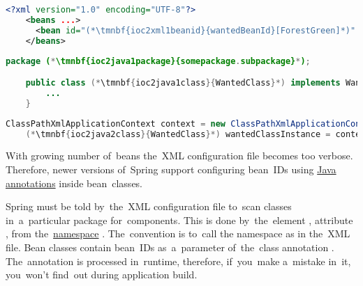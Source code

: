 \begin{lstlisting}[language=XML, title={Configuration XML}]
    <?xml version="1.0" encoding="UTF-8"?>
    <beans ...>
      <bean id="(*\tmnbf{ioc2xml1beanid}{wantedBeanId}[ForestGreen]*)" class="(*\tmnbf{ioc2xml1package}{somepackage.subpackage}[ForestGreen]*).(*\tmnbf{ioc2xml1class}{WantedClass}[ForestGreen]*)"/>
    </beans>
\end{lstlisting}
\begin{lstlisting}[language=Java, title={Wanted class}]
    package (*\tmnbf{ioc2java1package}{somepackage.subpackage}*);

    public class (*\tmnbf{ioc2java1class}{WantedClass}*) implements WantedClassInterface {
        ...
    }
\end{lstlisting}
\begin{lstlisting}[language=Java, title={Usage}]
    ClassPathXmlApplicationContext context = new ClassPathXmlApplicationContext("configurationFile.xml");
    (*\tmnbf{ioc2java2class}{WantedClass}*) wantedClassInstance = context.getBean("(*\tmnbf{ioc2java2beanid}{wantedBeanId}[ForestGreen]*)", (*\tmnbf{ioc2java2class2}{WantedClass}*).class);
\end{lstlisting}

\label{iocannotations}
With growing number of~beans the~XML configuration file becomes too verbose.
Therefore, newer versions of~Spring support configuring bean~IDs using \hyperref[javaannotation]{Java annotations} inside bean~classes.

Spring must be told by~the~XML configuration file to~scan classes in~a~particular package for~components.
This is done by~the~element , attribute , from the~\hyperref[namespaces]{namespace} .
The~convention is to~call the namespace as  in the~XML file.
Bean classes contain bean~IDs as~a~parameter of~the~class annotation .
The~annotation is processed in~runtime, therefore, if~you~make a~mistake in~it, you~won't find~out during application build.

